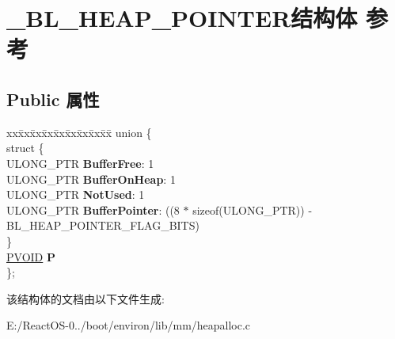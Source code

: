\hypertarget{struct___b_l___h_e_a_p___p_o_i_n_t_e_r}{}\section{\+\_\+\+B\+L\+\_\+\+H\+E\+A\+P\+\_\+\+P\+O\+I\+N\+T\+E\+R结构体 参考}
\label{struct___b_l___h_e_a_p___p_o_i_n_t_e_r}
\subsection*{Public 属性}
\begin{DoxyCompactItemize}
\item 
\mbox{\label{struct___b_l___h_e_a_p___p_o_i_n_t_e_r_a3c7709c324f78cdc79fd2777065b1f95}} 
\begin{tabbing}
xx\=xx\=xx\=xx\=xx\=xx\=xx\=xx\=xx\=\kill
union \{\\
\mbox{\label{union___b_l___h_e_a_p___p_o_i_n_t_e_r_1_1_0D141_abe61a93efbef6b643b227b47d5260d96}} 
\>struct \{\\
\>\>ULONG\_PTR {\bfseries BufferFree}: 1\\
\>\>ULONG\_PTR {\bfseries BufferOnHeap}: 1\\
\>\>ULONG\_PTR {\bfseries NotUsed}: 1\\
\>\>ULONG\_PTR {\bfseries BufferPointer}: ((8 $\ast$ sizeof(ULONG\_PTR)) -\/ BL\_HEAP\_POINTER\_FLAG\_BITS)\\
\>\} \\
\>\hyperlink{interfacevoid}{PVOID} {\bfseries P}\\
\}; \\

\end{tabbing}\end{DoxyCompactItemize}


该结构体的文档由以下文件生成\+:\begin{DoxyCompactItemize}
\item 
E\+:/\+React\+O\+S-\/0../boot/environ/lib/mm/heapalloc.\+c\end{DoxyCompactItemize}
